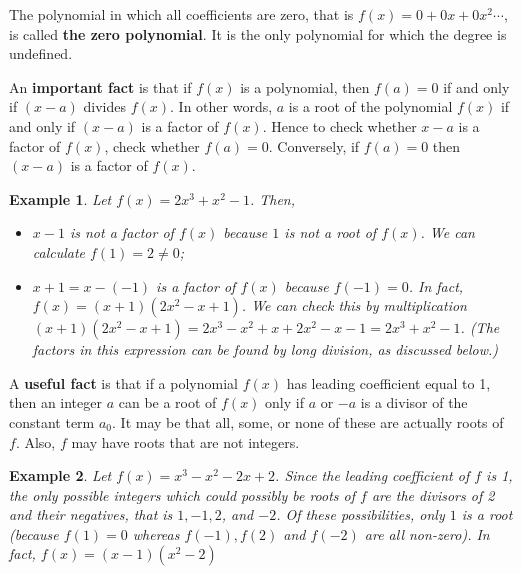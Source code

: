 \documentclass[11pt]{book}               %
\newtheorem{example}{Example}
\begin{document}
The polynomial in which all coefficients are zero, that is $f(x) = 0 + 0x + 0x^2  \cdots$,
is called \textbf{the zero polynomial}.  It is the only polynomial for which the degree is undefined.



An \textbf{important fact} is that if $f(x)$ is a polynomial, then $f(a)=0$ if and only if $(x-a)$ divides $f(x)$. In other words, $a$ is a root of the polynomial $f(x)$ if and only if $(x-a)$ is a factor of $f(x)$. 
Hence to check whether $x-a$ is a factor of $f(x)$, check whether $f(a) = 0$.
Conversely, if $f(a) = 0$ then $(x-a)$ is a factor of $f(x)$.

\begin{example} Let $f(x)=2x^3+x^2 -1$.  Then,
\normalfont
\begin{itemize}
\item $x-1$ is not a factor of $f(x)$ because  $1$ is not a root of $f(x)$.  We can calculate $f(1) = 2 \neq 0$;
\item $x+1 = x- (-1)$ is a factor of $f(x)$ because $f(-1) = 0$.  
In fact, $f(x) = (x+1)(2x^2 - x + 1)$.  
We can check this by multiplication $(x+1)(2x^2 - x + 1) = 2x^3 - x^2 + x + 2x^2 - x - 1 = 2x^3+x^2 -1$. 
(The factors in this expression can be found by long division, as discussed below.)
\end{itemize}
\end{example}

A \textbf{useful fact} is that if a polynomial $f(x)$ has leading coefficient equal to 1, 
then an integer $a$ can be a root of $f(x)$ only if $a$ or $-a$ is a divisor of the constant term $a_0$. 
It may be that all, some, or none of these are actually roots of $f$.
Also, $f$ may have roots that are not integers.

\begin{example} Let $f(x)=x^3-x^2-2x+2$.  Since the leading coefficient of $f$ is 1, 
the only possible integers which could possibly be roots of $f$ are the divisors of 2 and their negatives, that is $1, -1, 2$, and $-2$.  Of these possibilities, only $1$ is a root (because $f(1) = 0$ whereas $f(-1), f(2)$ and $f(-2)$ are all non-zero).  
In fact, $f(x) = (x-1)(x^2 - 2)$  
\label{ex8}
\end{example}
\end{document}
